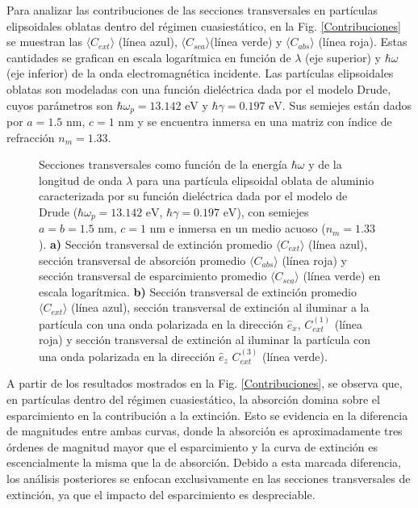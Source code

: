 Para analizar las contribuciones de las secciones transversales en partículas elipsoidales oblatas dentro del régimen cuasiestático, en la Fig. \ref{Contribuciones} se muestran las $\langle C_{ext} \rangle$ (línea azul), $\langle C_{sca} \rangle$(línea verde) y $\langle C_{abs} \rangle$ (línea roja). Estas cantidades se grafican en escala logarítmica en función de $\lambda$ (eje superior) y $\hbar\omega$ (eje inferior) de la onda electromagnética incidente. Las partículas elipsoidales oblatas son modeladas con una función dieléctrica dada por el modelo Drude, cuyos parámetros son $\hbar\omega_p=13.142\text{ eV}$ y $\hbar\gamma=0.197\text{ eV}$. Sus semiejes están dados por $a=1.5\text{ nm}$, $c=1\text{ nm}$ y se encuentra inmersa en una matriz con índice de refracción $n_m=1.33$. \\
\begin{figure}[h!]
	\quad%
	\caption{Secciones transversales como función de la energía $\hbar\omega$ y de la longitud de onda $\lambda$ para una partícula elipsoidal oblata de aluminio caracterizada por su función dieléctrica dada por el modelo de Drude ($\hbar\omega_p=13.142\text{ eV}$, $\hbar\gamma=0.197\text{ eV}$), con semiejes $a=b=1.5\text{ nm}$, $c=1\text{ nm}$ e inmersa en un medio acuoso ($n_m=1.33$). \textbf{a)}  Sección transversal de extinción promedio $\langle C_{ext}\rangle$  (línea azul), sección transversal de absorción promedio $\langle C_{abs}\rangle$  (línea roja) y sección transversal de esparcimiento promedio $\langle C_{sca}\rangle$  (línea verde) en escala logarítmica. \textbf{b)} Sección transversal de extinción promedio $\langle C_{ext}\rangle$ (línea azul), sección transversal de extinción al iluminar a la partícula con una onda polarizada en la dirección $\hat{e}_x$, $C_{ext}^{(1)}$  (línea roja)  y sección transversal de extinción al iluminar la partícula con una onda polarizada en la dirección $\hat{e}_z$ $C_{ext}^{(3)}$  (línea verde).} \label{fig:test}
\end{figure}

A partir de los resultados mostrados en la Fig. \ref{Contribuciones}, se observa que, en partículas dentro del régimen cuasiestático, la absorción domina sobre el esparcimiento en la contribución a la extinción. Esto se evidencia en la diferencia de magnitudes entre ambas curvas, donde la absorción es aproximadamente tres órdenes de magnitud mayor que el esparcimiento y la curva de extinción es escencialmente la misma que la de absorción. Debido a esta marcada diferencia, los análisis posteriores se enfocan exclusivamente en las secciones transversales de extinción, ya que el impacto del esparcimiento es despreciable.\\

